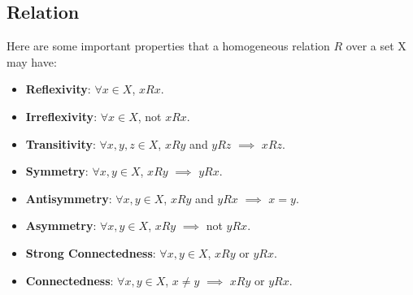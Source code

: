 \subsection{Relation}
Here are some important properties that a homogeneous relation $R$ over a set X may have:
\begin{itemize}
    \item \textbf{Reflexivity}: $\forall x \in X$, $xRx$.
    \item \textbf{Irreflexivity}: $\forall x \in X$, not $xRx$.
    \item \textbf{Transitivity}: $\forall x, y, z \in X$, $xRy$ and $yRz$ $\implies$ $xRz$.
    \item \textbf{Symmetry}: $\forall x, y \in X$, $xRy$ $\implies$ $yRx$.
    \item \textbf{Antisymmetry}: $\forall x, y \in X$, $xRy$ and $yRx$ $\implies$ $x = y$.
    \item \textbf{Asymmetry}: $\forall x, y \in X$, $xRy$ $\implies$ not $yRx$.
    \item \textbf{Strong Connectedness}: $\forall x, y \in X$, $xRy$ or $yRx$.
    \item \textbf{Connectedness}: $\forall x, y \in X$, $x\ne y$ $\implies$ $xRy$ or $yRx$.
\end{itemize}
